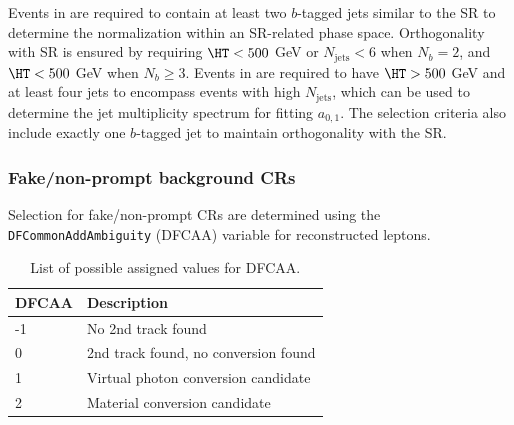 \documentclass[../thesis.tex]{subfiles}
\begin{document}
Events in \CRttWpm are required to contain at least two $b$-tagged jets similar to the SR to determine the \ttW normalization within an SR-related phase space. Orthogonality with SR is ensured by requiring $\HT<500$ GeV or $N_\mathrm{jets}<6$ when $N_b=2$, and $\HT<500$ GeV when $N_b\geq 3$. Events in \CRonebpm are required to have $\HT>500$ GeV and at least four jets to encompass events with high $N_\mathrm{jets}$, which can be used to determine the \ttW jet multiplicity spectrum for fitting $a_{0,1}$. The selection criteria also include exactly one $b$-tagged jet to maintain orthogonality with the \acs{SR}.

\subsubsection*{Fake/non-prompt background CRs}
Selection for fake/non-prompt \acs{CR}s are determined using the \verb|DFCommonAddAmbiguity| (DFCAA) variable for reconstructed leptons.

\begin{table}[!htbp]
\centering
\caption{\label{tab:ana:DFCAA}List of possible assigned values for DFCAA.}%
\begin{tabular}{p{2cm}|l}
\toprule\toprule
DFCAA & Description \\
\midrule
-1			& No 2nd track found \\
0			& 2nd track found, no conversion found \\
1			& Virtual photon conversion candidate \\
2			& Material conversion candidate\\
\bottomrule\bottomrule
\end{tabular}
\end{table}
\end{document}
